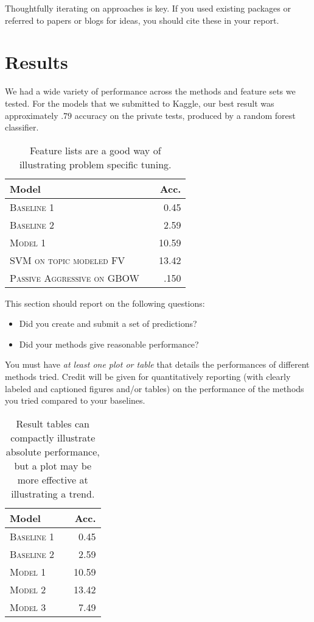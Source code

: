 \documentclass[11pt]{article}
\begin{document}
  \noindent Thoughtfully iterating on approaches is key.
  If you used existing packages or referred to papers or blogs for ideas,
  you should cite these in your report. 



\section{Results}
We had a wide variety of performance across the methods and feature sets we tested. For the models that we submitted to Kaggle, our best result was approximately $.79$ accuracy on the private tests, produced by a random forest classifier.
 \\
\begin{table}
\centering
\begin{tabular}{llr}
	\toprule
	Model &  & Acc. \\
	\midrule
	\textsc{Baseline 1} & & 0.45\\
	\textsc{Baseline 2} & & 2.59 \\
	\textsc{Model 1} & & 10.59  \\
	\textsc{SVM on topic modeled FV} & &13.42 \\
	\textsc{Passive Aggressive on GBOW} & & .150\\
	\bottomrule
\end{tabular}
\caption{Feature lists are a good way of illustrating problem specific tuning.}
\end{table}


\pagebreak

This section should report on the following questions: 

\begin{itemize}
\item Did you create and submit a set of predictions? 
  

\item  Did your methods give reasonable performance?  
\end{itemize}

\noindent You must have \textit{at least one plot or table}
that details the performances of different methods tried. 
Credit will be given for quantitatively reporting (with clearly
labeled and captioned figures and/or tables) on the performance of the
methods you tried compared to your baselines.



\begin{table}
\centering
\begin{tabular}{llr}
 \toprule
 Model &  & Acc. \\
 \midrule
 \textsc{Baseline 1} & & 0.45\\
 \textsc{Baseline 2} & & 2.59 \\
 \textsc{Model 1} & & 10.59  \\
 \textsc{Model 2} & &13.42 \\
 \textsc{Model 3} & & 7.49\\
 \bottomrule
\end{tabular}
\caption{\label{tab:results} Result tables can compactly illustrate absolute performance, but a plot may be more effective at illustrating a trend.}
\end{table}
\end{document}
